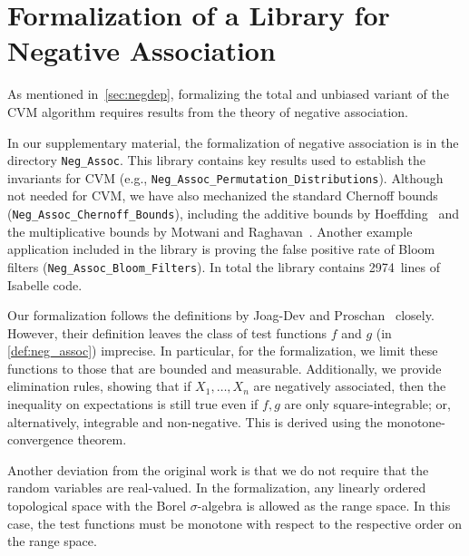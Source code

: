 \section{Formalization of a Library for Negative Association}\label{sec:formalization_neg_dep}
As mentioned in~\cref{sec:negdep}, formalizing the total and unbiased variant of the CVM algorithm requires results from the theory of negative association.

\begin{note}
In our supplementary material, the formalization of negative association is in the directory \verb|Neg_Assoc|.
This library contains key results used to establish the invariants for CVM (e.g., \verb|Neg_Assoc_Permutation_Distributions|).
Although not needed for CVM, we have also mechanized the standard Chernoff bounds (\verb|Neg_Assoc_Chernoff_Bounds|), including the additive bounds by Hoeffding~\cite[Th. 1, 2]{hoeffding1963} and the multiplicative bounds by Motwani and Raghavan~\cite[Th. 4.1, 4.2]{motwani1995}.
Another example application included in the library is proving the false positive rate of Bloom filters (\verb|Neg_Assoc_Bloom_Filters|).
In total the library contains 2974~lines of Isabelle code.
\lipicsEnd\end{note}

Our formalization follows the definitions by Joag-Dev and Proschan~\cite{joagdev1983} closely.
However, their definition leaves the class of test functions $f$ and $g$ (in \cref{def:neg_assoc}) imprecise.
In particular, for the formalization, we limit these functions to those that are bounded and measurable.
Additionally, we provide elimination rules, showing that if $X_1,\dots,X_n$ are negatively associated, then the inequality on expectations is still true even if $f, g$ are only square-integrable; or, alternatively, integrable and non-negative. This is derived using the monotone-convergence theorem.

Another deviation from the original work is that we do not require that the random variables are real-valued.
In the formalization, any linearly ordered topological space with the Borel $\sigma$-algebra is allowed as the range space.
In this case, the test functions must be monotone with respect to the respective order on the range space.

